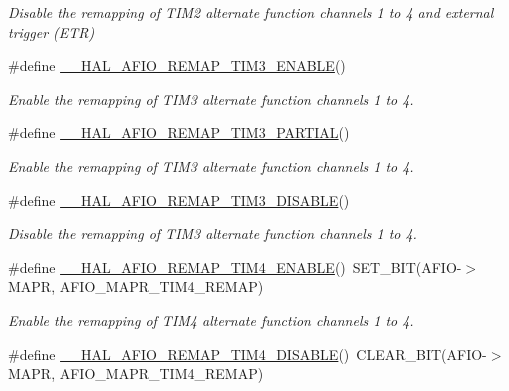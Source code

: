 \begin{DoxyCompactItemize}
\begin{DoxyCompactList}\small\item\em Disable the remapping of T\+I\+M2 alternate function channels 1 to 4 and external trigger (E\+TR) \end{DoxyCompactList}\item 
\#define \hyperlink{group___g_p_i_o_ex___a_f_i_o___a_f___r_e_m_a_p_p_i_n_g_ga276fb7e4041131b65c5bf293180dd052}{\+\_\+\+\_\+\+H\+A\+L\+\_\+\+A\+F\+I\+O\+\_\+\+R\+E\+M\+A\+P\+\_\+\+T\+I\+M3\+\_\+\+E\+N\+A\+B\+LE}()
\begin{DoxyCompactList}\small\item\em Enable the remapping of T\+I\+M3 alternate function channels 1 to 4. \end{DoxyCompactList}\item 
\#define \hyperlink{group___g_p_i_o_ex___a_f_i_o___a_f___r_e_m_a_p_p_i_n_g_ga207839eb8e1b063b22c2e579faec4183}{\+\_\+\+\_\+\+H\+A\+L\+\_\+\+A\+F\+I\+O\+\_\+\+R\+E\+M\+A\+P\+\_\+\+T\+I\+M3\+\_\+\+P\+A\+R\+T\+I\+AL}()
\begin{DoxyCompactList}\small\item\em Enable the remapping of T\+I\+M3 alternate function channels 1 to 4. \end{DoxyCompactList}\item 
\#define \hyperlink{group___g_p_i_o_ex___a_f_i_o___a_f___r_e_m_a_p_p_i_n_g_gade7c509d371e710403340173b3fbfecd}{\+\_\+\+\_\+\+H\+A\+L\+\_\+\+A\+F\+I\+O\+\_\+\+R\+E\+M\+A\+P\+\_\+\+T\+I\+M3\+\_\+\+D\+I\+S\+A\+B\+LE}()
\begin{DoxyCompactList}\small\item\em Disable the remapping of T\+I\+M3 alternate function channels 1 to 4. \end{DoxyCompactList}\item 
\#define \hyperlink{group___g_p_i_o_ex___a_f_i_o___a_f___r_e_m_a_p_p_i_n_g_ga9e9a7e0d5132518d81e0316895d4f410}{\+\_\+\+\_\+\+H\+A\+L\+\_\+\+A\+F\+I\+O\+\_\+\+R\+E\+M\+A\+P\+\_\+\+T\+I\+M4\+\_\+\+E\+N\+A\+B\+LE}()~S\+E\+T\+\_\+\+B\+IT(A\+F\+IO-\/$>$M\+A\+PR, A\+F\+I\+O\+\_\+\+M\+A\+P\+R\+\_\+\+T\+I\+M4\+\_\+\+R\+E\+M\+AP)
\begin{DoxyCompactList}\small\item\em Enable the remapping of T\+I\+M4 alternate function channels 1 to 4. \end{DoxyCompactList}\item 
\#define \hyperlink{group___g_p_i_o_ex___a_f_i_o___a_f___r_e_m_a_p_p_i_n_g_gae59894a1c15940479146c77596176dbe}{\+\_\+\+\_\+\+H\+A\+L\+\_\+\+A\+F\+I\+O\+\_\+\+R\+E\+M\+A\+P\+\_\+\+T\+I\+M4\+\_\+\+D\+I\+S\+A\+B\+LE}()~C\+L\+E\+A\+R\+\_\+\+B\+IT(A\+F\+IO-\/$>$M\+A\+PR, A\+F\+I\+O\+\_\+\+M\+A\+P\+R\+\_\+\+T\+I\+M4\+\_\+\+R\+E\+M\+AP)

\end{DoxyCompactItemize}
